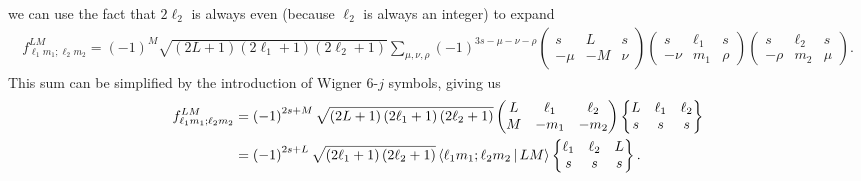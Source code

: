 \documentclass[notitlepage,twocolumn]{revtex4-2}
\newcommand{\p}[1]{\left(#1\right)} %
\newcommand{\bk}{\Braket} %
\newcommand{\1}{\mathds{1}}
\begin{document}
we can use the fact that $2\ell_2$ is always even (because $\ell_2$ is always an integer) to expand
\begin{align}
  f_{\ell_1 m_1;\ell_2 m_2}^{LM}
  = \p{-1}^M \sqrt{\p{2L+1}\p{2\ell_1+1}\p{2\ell_2+1}}
  \sum_{\mu,\nu,\rho} \p{-1}^{3s-\mu-\nu-\rho}
  \begin{pmatrix}
    s & L & s \\
    -\mu & -M & \nu
  \end{pmatrix}
  \begin{pmatrix}
    s & \ell_1 & s \\
    -\nu & m_1 & \rho
  \end{pmatrix}
  \begin{pmatrix}
    s & \ell_2 & s \\
    -\rho & m_2 & \mu
  \end{pmatrix}.
\end{align}
This sum can be simplified by the introduction of Wigner 6-$j$ symbols, giving us
\begin{align}
  f_{\ell_1 m_1;\ell_2 m_2}^{LM}
  &= \p{-1}^{2s+M} \sqrt{\p{2L+1}\p{2\ell_1+1}\p{2\ell_2+1}}
  \begin{pmatrix}
    L & \ell_1 & \ell_2 \\
    M & -m_1 & -m_2
  \end{pmatrix}
  \begin{Bmatrix}
    L & \ell_1 & \ell_2 \\
    s & s & s
  \end{Bmatrix} \\
  &= \p{-1}^{2s+L} \sqrt{\p{2\ell_1+1}\p{2\ell_2+1}}
  \bk{\ell_1 m_1; \ell_2 m_2| LM}
  \begin{Bmatrix}
    \ell_1 & \ell_2 & L \\
    s & s & s
  \end{Bmatrix}.
\end{align}
\end{document}
